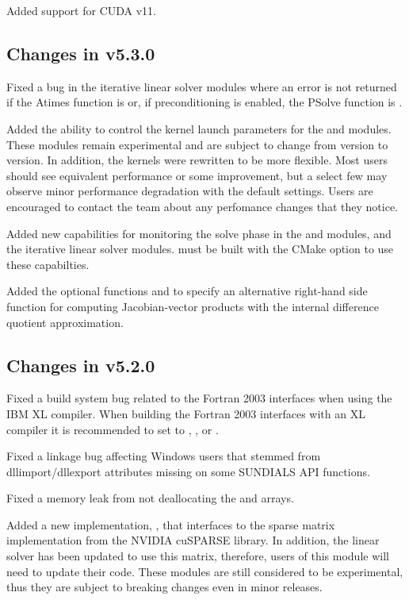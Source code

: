 Added support for CUDA v11.


\subsection*{Changes in v5.3.0}

Fixed a bug in the iterative linear solver modules where an error is not
returned if the Atimes function is  or, if preconditioning is enabled,
the PSolve function is .

Added the ability to control the {\cuda} kernel launch parameters for the
 and  modules. These modules remain
experimental and are subject to change from version to version.
In addition, the  kernels were rewritten to be more flexible.
Most users should see equivalent performance or some improvement, but a select
few may observe minor performance degradation with the default settings. Users
are encouraged to contact the {\sundials} team about any perfomance changes
that they notice.

Added new capabilities for monitoring the solve phase in the {\sunnonlinsolnewton}
and {\sunnonlinsolfixedpoint} modules, and the {\sundials} iterative linear solver
modules. {\sundials} must be built with the CMake option
 to use these capabilties.

Added the optional functions  and
 to specify an alternative right-hand side function
for computing Jacobian-vector products with the internal difference quotient
approximation.

\subsection*{Changes in v5.2.0}

Fixed a build system bug related to the Fortran 2003 interfaces when using the
IBM XL compiler. When building the Fortran 2003 interfaces with an XL compiler
it is recommended to set  to ,
, or .

Fixed a linkage bug affecting Windows users that stemmed from dllimport/dllexport
attributes missing on some SUNDIALS API functions.

Fixed a memory leak from not deallocating the  and 
arrays.

Added a new  implementation, , that interfaces
to the sparse matrix implementation from the NVIDIA cuSPARSE library. In addition,
the  linear solver has been updated to
use this matrix, therefore, users of this module will need to update their code.
These modules are still considered to be experimental, thus they are subject to
breaking changes even in minor releases.

